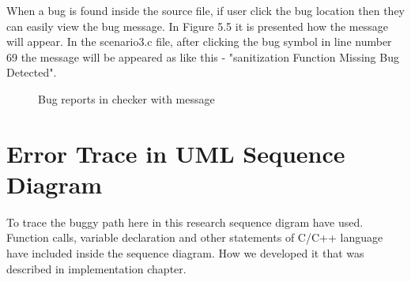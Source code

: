 When a bug is found inside the source file, if user click the bug location then they can easily view the bug message. In Figure 5.5 it is presented how the message will appear. In the scenario3.c file,
after clicking the bug symbol in line number 69 the message will be appeared as like this - "sanitization
Function Missing Bug Detected".

\begin{figure}[htbp]
	\centering
	\label{fig:bugDetectionWithMessage}
	\caption{Bug reports in checker with message}
\end{figure}

\section{Error Trace in UML Sequence Diagram}

To trace the buggy path here in this research sequence digram have used. Function calls, variable declaration and other statements of C/C++ language have included inside the sequence diagram. How we developed it that was described in implementation chapter. 

